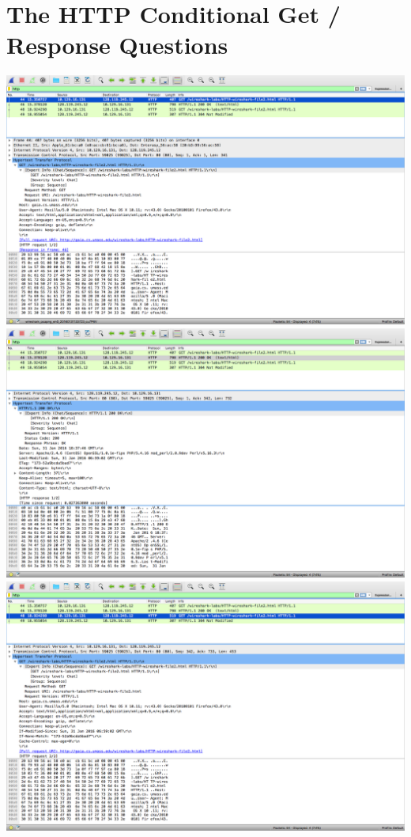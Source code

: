 \documentclass{article}
\begin{document}
\section {The HTTP Conditional Get / Response Questions}
\includegraphics[width=\textwidth]{HTTPConditionalGet}\\
\includegraphics[width=\textwidth]{HTTPConditionalOk}\\
\includegraphics[width=\textwidth]{HTTPConditional2Get}\\
\end{document}
